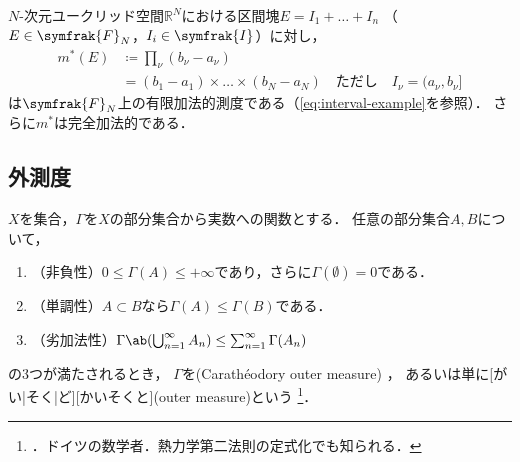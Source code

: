 \documentclass[../sotsu.tex]{subfiles}
\begin{document}
\begin{proposition}
    \label{thm:Lebesgue-finitely-additive-measure}
    $N$-次元ユークリッド空間$ℝ^N$における区間塊$E = I_1 + \dots + I_n$
    （$E \in \symfrak{F}_N$，$I_i \in \symfrak{I}$）に対し，
    \begin{equation}
        \begin{split}
            m^* (E)  &\coloneq  \prod_\nu (b_\nu - a_\nu)  \\
                     &=  (b_1 - a_1) \times \dots \times (b_N - a_N)
                     \quad \text{ただし} \quad I_\nu = (a_\nu, b_\nu]
        \end{split}
    \end{equation}
    は$\symfrak{F}_N$上の有限加法的測度である（\cref{eq:interval-example}を参照）．
    さらに$m^*$は完全加法的である．
\end{proposition}



\subsection{外測度}

\begin{definition}[外測度]
    $X$を集合，$\Gamma$を$X$の部分集合から実数への関数とする．
    任意の部分集合$A, B$について，
    \begin{enumerate}
        \item （非負性）$0 \leq \Gamma(A) \leq +\infty$であり，さらに$\Gamma(\emptyset) = 0$である．
        \item （単調性）$A \subset B$なら$\Gamma(A) \leq \Gamma(B)$である．
        \item （劣加法性）$\Gamma \ab( \bigcup_{n=1}^{\infty} A_n ) \leq \sum_{n=1}^{\infty} \Gamma(A_n)$
    \end{enumerate}
    の3つが満たされるとき，
    $\Gamma$を(Carathéodory outer measure)%
    \cite{rikagaku-eiwa}，
    あるいは単に[がい|そく|ど][かいそくと](outer measure)という\cite{ito-lebesgue-1963}%
    \footnote{．ドイツの数学者．熱力学第二法則の定式化でも知られる．\cite{nipponica}}．
\end{definition}
\end{document}
